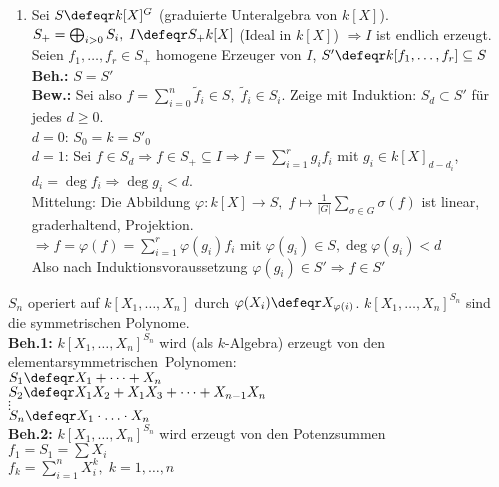 \begin{Bew}
  \begin{enumerate}
    \item 
      Sei $S \defeqr k[X]^G$ (graduierte Unteralgebra von $k[X]$).\\
      $S_+ = \bigoplus_{i > 0} S_i, \; I \defeqr S_+ k[X]$ (Ideal in $k[X]$) 
      $\Rightarrow I$ ist endlich erzeugt.\\
      Seien $f_1, \dots, f_r \in S_+$ homogene Erzeuger von $I$, $S' \defeqr k[f_1,
      \dots, f_r] \subseteq S$\\
      \textbf{Beh.:} $S=S'$\\
      \textbf{Bew.:} Sei also $f = \sum_{i=0}^n \tilde{f}_i \in S, \; \tilde{f}_i
      \in S_i$. Zeige mit Induktion: $S_d \subset S'$ für jedes $d \ge 0$.\\
      $d = 0$: $S_0 = k = S'_0$\\
      $d = 1$: Sei $f \in S_d \Rightarrow f \in S_+ \subseteq I \Rightarrow f =
      \sum_{i=1}^r g_i f_i$ mit $g_i \in k[X]_{d- d_i}$, $d_i = \deg{f_i}
      \Rightarrow \deg{g_i} < d$.\\
      \glqq Mittelung\grqq: Die Abbildung $\varphi: k[X] \to S, \; f \mapsto
      \frac{1}{|G|} \sum_{\sigma \in G} \sigma(f)$ ist linear, graderhaltend,
      Projektion.\\
      $\Rightarrow f = \varphi(f) = \sum_{i=1}^r \varphi(g_i) f_i$ mit
      $\varphi(g_i) \in S,\deg{\varphi(g_i)}<d$\\
      Also nach Induktionsvoraussetzung $\varphi(g_i) \in S' \Rightarrow f \in
      S'$
  \end{enumerate}
\end{Bew}

\begin{nnBsp}
  $S_n$ operiert auf $k[X_1, \dots, X_n]$ durch $\varphi(X_i) \defeqr
  X_{\varphi(i)}$. $k[X_1, \dots, X_n]^{S_n}$ sind die symmetrischen Polynome.\\
  \textbf{Beh.1:} $k[X_1, \dots, X_n]^{S_n}$ wird (als $k$-Algebra) erzeugt von
  den \glqq elementarsymmetrischen\grqq\ Polynomen:\\ $S_1 \defeqr X_1 + \dots +
  X_n$\\ $S_2 \defeqr X_1X_2 + X_1X_3 + \dots + X_{n-1}X_n$\\
  $\vdots$\\
  $S_n \defeqr X_1 \cdot \ldots \cdot X_n$\\
  \textbf{Beh.2:} $k[X_1, \dots, X_n]^{S_n}$ wird erzeugt von den Potenzsummen\\
  $f_1 = S_1 = \sum X_i$\\
  $f_k = \sum_{i=1}^n X_i^k, \; k = 1, \dots, n$
\end{nnBsp}

